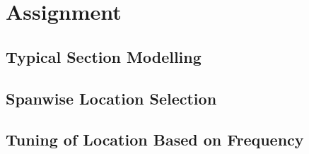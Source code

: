 \chapter{Assignment}












\section{Typical Section Modelling}

\section{Spanwise Location Selection}

\section{Tuning of Location Based on Frequency}

